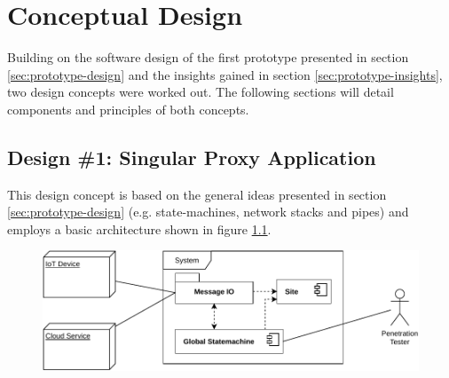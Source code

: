 \chapter{Conceptual Design}
\label{chap:conceptual-design}

Building on the software design of the first prototype presented in section \ref{sec:prototype-design} and the insights gained in section \ref{sec:prototype-insights}, two design concepts were worked out. The following sections will detail components and principles of both concepts.

\section{Design \#1: Singular Proxy Application}
\label{sec:design-1}
This design concept is based on the general ideas presented in section \ref{sec:prototype-design} (e.g. state-machines, network stacks and pipes) and employs a basic architecture shown in figure \ref{fig:component-view-1}.
\begin{figure}[h]
    \centering
    \includegraphics[width=12cm]{img/ch05/component-view-1.pdf}
    \label{fig:component-view-1}
\end{figure}

